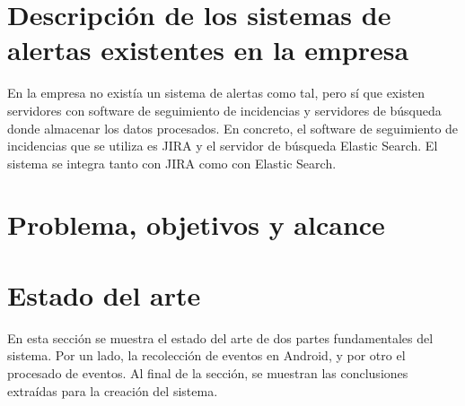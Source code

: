 \section{Descripción de los sistemas de alertas existentes en la empresa}
En la empresa no existía un sistema de alertas como tal, pero sí que existen servidores con software de seguimiento de incidencias y servidores de búsqueda donde almacenar los datos procesados. En concreto, el software de seguimiento de incidencias que se utiliza es JIRA\cite{Tfg:jira} y el servidor de búsqueda Elastic Search\cite{Tfg:elasticsearch}. El sistema se integra tanto con JIRA como con Elastic Search.

\section{Problema, objetivos y alcance}



\section{Estado del arte}
En esta sección se muestra el estado del arte de dos partes fundamentales del sistema. Por un lado, la recolección de eventos en Android, y por otro el procesado de eventos. Al final de la sección, se muestran las conclusiones extraídas para la creación del sistema.

